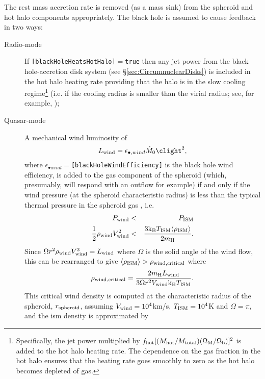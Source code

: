 The rest mass accretion rate is removed (as a mass sink) from the spheroid and hot halo components appropriately. The black hole is assumed to cause feedback in two ways:
\begin{description}
 \item [Radio-mode] If {\tt [blackHoleHeatsHotHalo]}$=${\tt true} then any jet power from the black hole-accretion disk system (see \S\ref{sec:CircumnuclearDisks}) is included in the hot halo heating rate providing that the halo is in the slow cooling regime\footnote{Specifically, the jet power multiplied by $f_{\rm hot} [(M_{\rm hot}/M_{\rm total}) (\Omega_{\rm M}/\Omega_{\rm b})]^2$ is added to the hot halo heating rate. The dependence on the gas fraction in the hot halo ensures that the heating rate goes smoothly to zero as the hot halo becomes depleted of gas.} (i.e. if the cooling radius is smaller than the virial radius; see, for example, \citealt{benson_cold_2010});
 \item [Quasar-mode] A mechanical wind luminosity of \citep{ostriker_momentum_2010}
\begin{equation}
 L_{\rm wind} = \epsilon_{\bullet, wind} \dot{M}_0 \clight^2,
\end{equation}
where $\epsilon_{\bullet wind}=${\tt [blackHoleWindEfficiency]} is the black hole wind efficiency, is added to the gas \gls{component} of the spheroid (which, presumably, will respond with an outflow for example) if and only if the wind pressure (at the spheroid characteristic radius) is less than the typical thermal pressure in the spheroid gas \citep{ciotti_feedbackcentral_2009}, i.e.
\begin{eqnarray}
 P_{\rm wind} &<& P_{\rm ISM} \nonumber \\
 \frac{1}{2}\rho_{\rm wind} V_{\rm wind}^2 &<& {3 {\rm k_B} T_{\rm ISM} \langle \rho_{\rm ISM}\rangle \over 2 m_{\rm H}}.
\end{eqnarray}
Since $\Omega r^2 \rho_{\rm wind} V_{\rm wind}^3 = L_{\rm wind}$ where $\Omega$ is the solid angle of the wind flow, this can be rearranged to give $\langle\rho_{\rm ISM}\rangle > \rho_{\rm wind, critical}$ where
\begin{equation}
\rho_{\rm wind,critical} = {2 m_{\rm H} L_{\rm wind} \over 3 \Omega r^2 V_{\rm wind} {\rm k_B} T_{\rm ISM}}.
\end{equation}
This critical wind density is computed at the characteristic radius of the spheroid, $r_{\rm spheroid}$, assuming $V_{\rm wind}=10^4$km/s, $T_{\rm ISM}=10^4$K and $\Omega=\pi$, and the \gls{ism} density is approximated by

\end{description}
